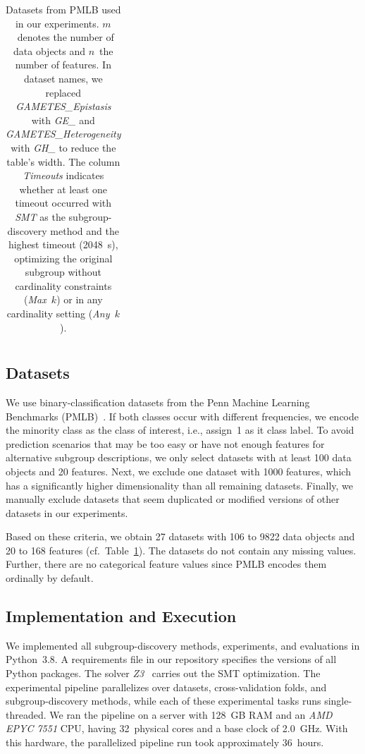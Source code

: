 \documentclass{article}
\theoremstyle{definition}
\begin{document}
\begin{table}[p]
\begin{tabular}{lrrll}
		\bottomrule
	\end{tabular}
	\caption{
		Datasets from PMLB used in our experiments.
		$m$~denotes the number of data objects and $n$~the number of features.
		In dataset names, we replaced \emph{GAMETES\_Epistasis} with  \emph{GE\_} and \emph{GAMETES\_Heterogeneity} with \emph{GH\_} to reduce the table's width.
		The column \emph{Timeouts} indicates whether at least one timeout occurred with \emph{SMT} as the subgroup-discovery method and the highest timeout (2048~s), optimizing the original subgroup without cardinality constraints (\emph{Max~$k$}) or in any cardinality setting (\emph{Any~$k$}).
	}
	\label{tab:csd:datasets}
\end{table}

\subsection{Datasets}
\label{sec:csd:experimental-design:datasets}

We use binary-classification datasets from the Penn Machine Learning Benchmarks (PMLB)~\cite{olson2017pmlb, romano2021pmlb}.
If both classes occur with different frequencies, we encode the minority class as the class of interest, i.e., assign~1 as it class label.
To avoid prediction scenarios that may be too easy or have not enough features for alternative subgroup descriptions, we only select datasets with at least 100 data objects and 20 features.
Next, we exclude one dataset with 1000 features, which has a significantly higher dimensionality than all remaining datasets.
Finally, we manually exclude datasets that seem duplicated or modified versions of other datasets in our experiments.

Based on these criteria, we obtain 27 datasets with 106 to 9822 data objects and 20 to 168 features (cf.~Table~\ref{tab:csd:datasets}).
The datasets do not contain any missing values.
Further, there are no categorical feature values since PMLB encodes them ordinally by default.

\subsection{Implementation and Execution}
\label{sec:csd:experimental-design:implementation}

We implemented all subgroup-discovery methods, experiments, and evaluations in Python~3.8.
A requirements file in our repository specifies the versions of all Python packages.
The solver \emph{Z3}~\cite{bjorner2015nuz, deMoura2008z3} carries out the SMT optimization.
The experimental pipeline parallelizes over datasets, cross-validation folds, and subgroup-discovery methods, while each of these experimental tasks runs single-threaded.
We ran the pipeline on a server with 128~GB RAM and an \emph{AMD EPYC 7551} CPU, having 32~physical cores and a base clock of 2.0~GHz.
With this hardware, the parallelized pipeline run took approximately 36~hours.
\end{document}
